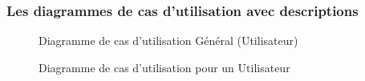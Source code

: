 \documentclass[12pt]{report}
\begin{document}
\vspace{-0.3in}

\subsubsection{\large{Les diagrammes de cas d'utilisation avec descriptions}}

\vspace{-0.1in}

\begin{figure}[h]
\centering
    \centerline{}
    \caption{Diagramme de cas d'utilisation Général (Utilisateur)}
\end{figure}

\newpage

\begin{figure}[h]
\centering
  \vspace{-0.1in}
    \centerline{}
    \caption{Diagramme de cas d'utilisation pour un Utilisateur}
\end{figure}
\end{document}

